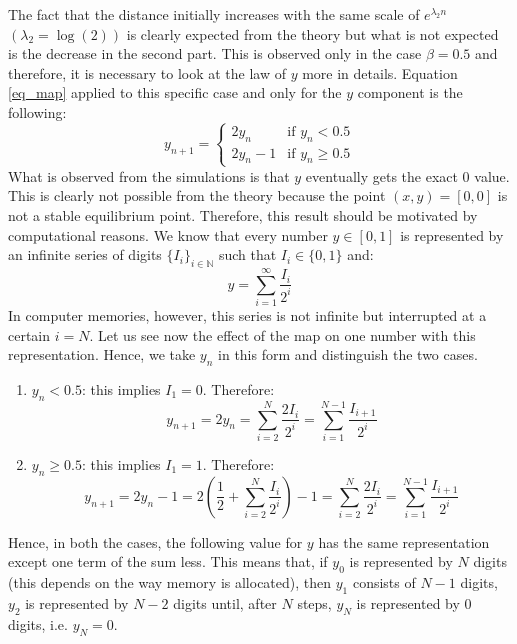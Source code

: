 \documentclass[11pt,titlepage]{article}
\begin{document}
The fact that the distance initially increases with the same scale of $e^{\lambda_2 n}$  $(\lambda_2=\log(2))$ is clearly expected from the theory but what is not expected is the decrease in the second part. This is observed only in the case $\beta=0.5$ and therefore, it is necessary to look at the law of $y$ more in details. Equation \ref{eq_map} applied to this specific case and only for the $y$ component is the following:
\begin{equation*}
	y_{n+1} = 
	\begin{cases}
		2y_n & \text{if } y_n < 0.5 \\
		2y_n -1 & \text{if } y_n \ge 0.5
	\end{cases}
\end{equation*}
What is observed from the simulations is that $y$ eventually gets the exact 0 value. This is clearly not possible from the theory because the point $(x,y) = [0,0]$ is not a stable equilibrium point. Therefore, this result should be motivated by computational reasons. We know that every number $y \in [0,1]$ is represented by an infinite series of digits $\{I_i\}_{i \in \mathbb{N}}$ such that $I_i \in \{0,1\}$ and:
\begin{equation*}
	y = \sum_{i=1}^\infty \frac{I_i}{2^i}
\end{equation*}
In computer memories, however, this series is not infinite but interrupted at a certain $i=N$. Let us see now the effect of the map on one number with this representation. Hence, we take $y_n$ in this form and distinguish the two cases.
\begin{enumerate}
	\item $y_n < 0.5$: this implies $I_1=0$. Therefore:
	\begin{equation*}
		y_{n+1} = 2y_n = \sum_{i=2}^N \frac{2 I_i}{2^i} = \sum_{i=1}^{N-1} \frac{I_{i+1}}{2^i}
	\end{equation*}
	\item $y_n \ge 0.5$: this implies $I_1=1$. Therefore:
	\begin{equation*}
		y_{n+1} = 2y_n - 1 = 2\left( \frac{1}{2} +\sum_{i=2}^N \frac{I_i}{2^i}\right) - 1 =  \sum_{i=2}^N \frac{2 I_i}{2^i} = \sum_{i=1}^{N-1} \frac{I_{i+1}}{2^i}
	\end{equation*}
\end{enumerate}
Hence, in both the cases, the following value for $y$ has the same representation except one term of the sum less. This means that, if $y_0$ is represented by $N$ digits (this depends on the way memory is allocated), then $y_1$ consists of $N-1$ digits,  $y_2$ is represented by $N-2$ digits until, after $N$ steps, $y_N$ is represented by $0$ digits, i.e. $y_N = 0$. \\
\end{document}
